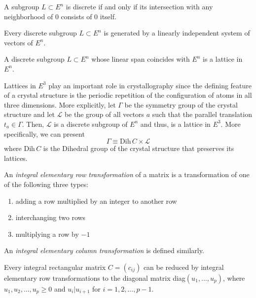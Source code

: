 \documentclass{article}
\begin{document}
    \begin{proposition}
      A subgroup $L \subset E^n$ is discrete if and only if its intersection with any neighborhood of $0$ consists of $0$ itself. 
    \end{proposition}

    \begin{theorem}
      Every discrete subgroup $L \subset E^n$ is generated by a linearly independent system of vectors of $E^n$. 
    \end{theorem}

    \begin{corollary}
      A discrete subgroup $L \subset E^n$ whose linear span coincides with $E^n$ is a lattice in $E^n$. 
    \end{corollary}

    Lattices in $E^3$ play an important role in crystallography since the defining feature of a crystal structure is the periodic repetition of the configuration of atoms in all three dimensions. More explicitly, let $\Gamma$ be the symmetry group of the crystal structure and let $\mathcal{L}$ be the group of all vectors $a$ such that the parallel translation $t_a \in \Gamma$. Then, $\mathcal{L}$ is a discrete subgroup of $E^n$ and thus, is a lattice in $E^3$. More specifically, we can present 
    \begin{equation}
      \Gamma \equiv \text{Dih}\,C \times \mathcal{L}
    \end{equation}
    where Dih$\, C$ is the Dihedral group of the crystal structure that preserves its lattices. 

    \begin{definition}
      An \textit{integral elementary row transformation} of a matrix is a transformation of one of the following three types: 
      \begin{enumerate}
        \item adding a row multiplied by an integer to another row
        \item interchanging two rows
        \item multiplying a row by $-1$ 
      \end{enumerate}
      An \textit{integral elementary column transformation} is defined similarly. 
    \end{definition}

    \begin{proposition}
      Every integral rectangular matrix $C = (c_{i j})$ can be reduced by integral elementary row transformations to the diagonal matrix diag$(u_1, ..., u_p)$, where $u_1, u_2, ..., u_p \geq 0$ and $u_i | u_{i+1}$ for $i = 1, 2, ..., p -1$. 
    \end{proposition}
\end{document}
